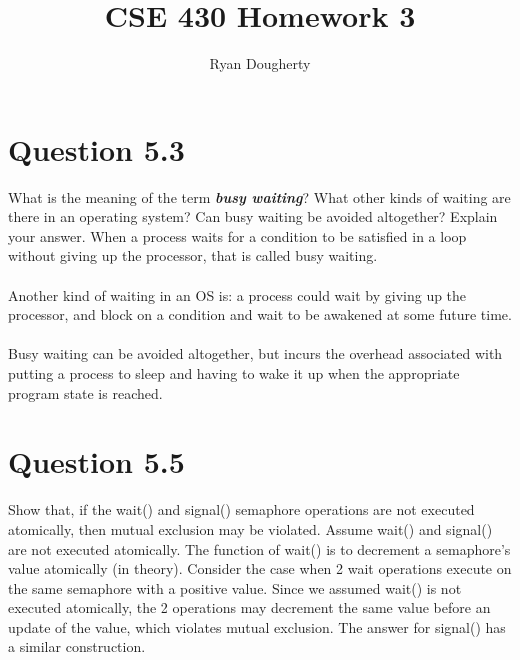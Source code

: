 \documentclass[12pt]{article}
\title{CSE 430 Homework 3}
\author{Ryan Dougherty}
\date{}                                           %
\begin{document}
\maketitle

\section*{Question 5.3} {\color{blue}What is the meaning of the term \textbf{\emph{busy waiting}}? What other kinds of waiting are there in an operating system? Can busy waiting be avoided altogether? Explain your answer.} 
When a process waits for a condition to be satisﬁed in a loop without giving up the processor, that is called busy waiting.
\\ \\
Another kind of waiting in an OS is: a process could wait by giving up the processor, and block on a condition and wait to be awakened at some future time. 
\\ \\
Busy waiting can be avoided altogether, but incurs the overhead associated with putting a process to sleep and having to wake it up when the appropriate program state is reached.

\section*{Question 5.5} {\color{blue}Show that, if the wait() and signal() semaphore operations are not executed atomically, then mutual exclusion may be violated.} 
Assume wait() and signal() are not executed atomically. The function of wait() is to decrement a semaphore's value atomically (in theory). Consider the case when 2 wait operations execute on the same semaphore with a positive value. Since we assumed wait() is not executed atomically, the 2 operations may decrement the same value before an update of the value, which violates mutual exclusion. The answer for signal() has a similar construction.
\end{document}
